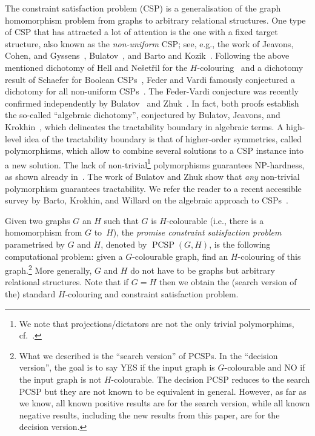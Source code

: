 \documentclass[11pt,a4paper]{scrartcl}
\numberwithin{theorem}{section}
\theoremstyle{definition}
\DeclareMathOperator{\PCSP}{PCSP}
\begin{document}
The constraint satisfaction problem (CSP) is a generalisation of the graph
homomorphism problem from graphs to arbitrary relational structures. One type of
CSP that has attracted a lot of attention is the one with a fixed target
structure, also known as the \emph{non-uniform} CSP; see, e.g., the work of
Jeavons, Cohen, and Gyssens~\cite{Jeavons97:jacm},
Bulatov~\cite{Bulatov06:3-elementJACM,Bulatov11:conservative}, and Barto and
Kozik~\cite{Barto14:jacm,Barto16:sicomp}. Following the above mentioned
dichotomy of Hell and Ne\v{s}et\v{r}il for the $H$-colouring~\cite{HellN90} and
a dichotomy result of Schaefer for Boolean CSPs~\cite{Schaefer78:complexity},
Feder and Vardi famously conjectured a dichotomy for all non-uniform
CSPs~\cite{Feder98:monotone}. The Feder-Vardi conjecture was recently confirmed 
independently by Bulatov~\cite{Bulatov17:focs} and Zhuk~\cite{Zhuk17:focs}. In
fact, both proofs establish the so-called ``algebraic dichotomy'', conjectured
by Bulatov, Jeavons, and Krokhin~\cite{Bulatov05:classifying}, which delineates
the tractability boundary in algebraic terms. A high-level idea of the
tractability boundary is that of higher-order symmetries, called polymorphisms,
which allow to combine several solutions to a CSP instance into a new solution.
The lack of non-trivial\footnote{We note that projections/dictators are not the
only trivial polymorphims, cf.~\cite[Example~41]{bkw17:survey}.} polymorphisms guarantees NP-hardness, as shown
already in~\cite{Bulatov05:classifying}. The work of Bulatov and Zhuk show that
\emph{any} non-trivial polymorphism guarantees tractability. We refer the
reader to a recent accessible survey by Barto, Krokhin, and Willard on the
algebraic approach to CSPs~\cite{bkw17:survey}.

Given two graphs $G$ an $H$ such that $G$ is $H$-colourable (i.e., there is
a homomorphism from $G$ to~$H$), the \emph{promise constraint satisfaction
problem} parametrised by $G$ and $H$, denoted by $\PCSP(G,H)$, is the following
computational problem: given a $G$-colourable graph, find an $H$-colouring of
this graph.\footnote{What we described is the ``search version'' of PCSPs. In
the ``decision version'', the goal is to say \textsf{YES} if the input graph is
$G$-colourable and \textsf{NO} if the input graph is not $H$-colourable. The decision
PCSP reduces to the search PCSP but they are not known to be equivalent in
general. However, as far as we know, all known positive results are for the
search version, while all known negative results, including the new results from this
paper, are for the decision version.}
More generally, $G$ and $H$ do not have to be graphs but arbitrary relational
structures. Note that if $G=H$ then we obtain the (search version of the)
standard $H$-colouring and constraint satisfaction problem.
\end{document}
